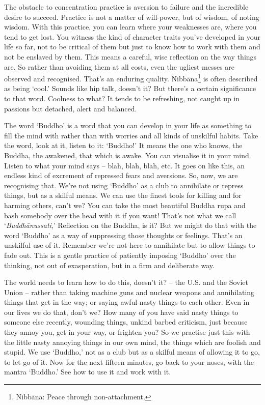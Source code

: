 The obstacle to concentration practice is aversion to failure and the incredible desire to succeed. Practice is not a matter of will-power, but of wisdom, of noting wisdom. With this practice, you can learn where your weaknesses are, where you tend to get lost. You witness the kind of character traits you've developed in your life so far, not to be critical of them but just to know how to work with them and not be enslaved by them. This means a careful, wise reflection on the way things are. So rather than avoiding them at all costs, even the ugliest messes are observed and recognised. That's an enduring quality. Nibb\=ana\footnote{Nibb\=ana: Peace through non-attachment.} is often described as being `cool.' Sounds like hip talk, doesn't it? But there's a certain significance to that word. Coolness to what? It tends to be refreshing, not caught up in passions but detached, alert and balanced.

The word `Buddho' is a word that you can develop in your life as something to fill the mind with rather than with worries and all kinds of unskilful habits. Take the word, look at it, listen to it: `Buddho!' It means the one who knows, the Buddha, the awakened, that which is awake. You can visualise it in your mind. Listen to what your mind says -- blah, blah, blah, etc. It goes on like this, an endless kind of excrement of repressed fears and aversions. So, now, we are recognising that. We're not using `Buddho' as a club to annihilate or repress things, but as a skilful means. We can use the finest tools for killing and for harming others, can't we? You can take the most beautiful Buddha rupa and bash somebody over the head with it if you want! That's not what we call `\textit{Buddhānussati},' Reflection on the Buddha, is it? But we might do that with the word `Buddho' as a way of suppressing those thoughts or feelings. That's an unskilful use of it. Remember we're not here to annihilate but to allow things to fade out. This is a gentle practice of patiently imposing `Buddho' over the thinking, not out of exasperation, but in a firm and deliberate way.

The world needs to learn how to do this, doesn't it? -- the U.S. and the Soviet Union -- rather than taking machine guns and nuclear weapons and annihilating things that get in the way; or saying awful nasty things to each other. Even in our lives we do that, don't we? How many of you have said nasty things to someone else recently, wounding things, unkind barbed criticism, just because they annoy you, get in your way, or frighten you? So we practise just this with the little nasty annoying things in our own mind, the things which are foolish and stupid. We use `Buddho,' not as a club but as a skilful means of allowing it to go, to let go of it. Now for the next fifteen minutes, go back to your noses, with the mantra `Buddho.' See how to use it and work with it.

